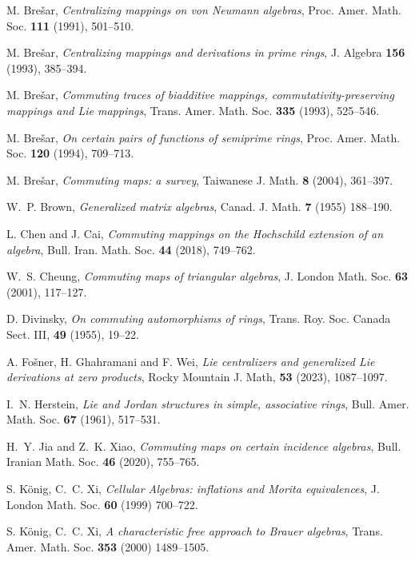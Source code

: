 \documentclass[reqno]{amsart}
\theoremstyle{plain}
\theoremstyle{definition}
\begin{document}
\begin{thebibliography}{}

 M. Bre\v{s}ar, {\em Centralizing mappings on von Neumann algebras},
Proc. Amer. Math. Soc. {\bf 111} (1991), 501--510.

 M. Bre\v{s}ar, {\em Centralizing mappings and derivations in prime rings},
J. Algebra {\bf 156} (1993), 385--394.

 M. Bre\v{s}ar, {\em Commuting traces of biadditive mappings, commutativity-preserving mappings and Lie mappings}, Trans. Amer. Math. Soc.
{\bf 335} (1993), 525--546.

 M. Bre\v{s}ar, {\em On certain pairs of functions of semiprime rings},
Proc. Amer. Math. Soc. {\bf 120} (1994), 709--713.

 M. Bre\v{s}ar, {\em Commuting maps: a survey},
Taiwanese J. Math. {\bf 8} (2004), 361--397.

 W.~P. Brown, {\em Generalized matrix algebras},  Canad. J. Math. {\bf 7} (1955) 188--190.


 L. Chen and J. Cai, {\em Commuting mappings on the Hochschild extension of an algebra},
Bull. Iran. Math. Soc. {\bf 44} (2018), 749--762.

 W.~S. Cheung, {\em Commuting maps of triangular algebras},
J. London Math. Soc. {\bf 63} (2001), 117--127.

 D. Divinsky, {\em On commuting automorphisms of rings},
Trans. Roy. Soc. Canada Sect. III, {\bf 49} (1955), 19--22.


A. Fo\v{s}ner, H. Ghahramani and F. Wei, {\em Lie centralizers and generalized Lie derivations at zero products}, Rocky Mountain J. Math, {\bf  53} (2023), 1087--1097.

 I.~N. Herstein, {\em Lie and Jordan structures in simple, associative rings},
Bull. Amer. Math. Soc. {\bf 67} (1961), 517--531.

  H.~Y. Jia and  Z.~K. Xiao, {\em Commuting maps on certain incidence algebras},
Bull. Iranian Math. Soc. {\bf 46} (2020), 755--765.


 S. K\"onig, C.~C. Xi, {\em Cellular Algebras: inflations and Morita equivalences}, 
J. London Math. Soc.  {\bf 60} (1999) 700--722.

  S. K\"onig, C.~C. Xi, {\em A characteristic free approach to Brauer algebras}, 
Trans. Amer. Math. Soc. {\bf 353} (2000) 1489--1505.


\end{thebibliography}
\end{document}
